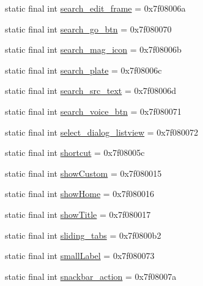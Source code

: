 \begin{CompactItemize}
\item 
static final int \hyperlink{classandroid_1_1support_1_1v7_1_1cardview_1_1_r_1_1id_cdcd1faf07234c23e78ff9e0a8ead7ea}{search\_\-edit\_\-frame} = 0x7f08006a
\item 
static final int \hyperlink{classandroid_1_1support_1_1v7_1_1cardview_1_1_r_1_1id_114052ec459693b90d0ca9a2bfab05f0}{search\_\-go\_\-btn} = 0x7f080070
\item 
static final int \hyperlink{classandroid_1_1support_1_1v7_1_1cardview_1_1_r_1_1id_bb635eb1793bd8857226cd3682f21097}{search\_\-mag\_\-icon} = 0x7f08006b
\item 
static final int \hyperlink{classandroid_1_1support_1_1v7_1_1cardview_1_1_r_1_1id_41dde8935259d539e700ab3c94dc6f18}{search\_\-plate} = 0x7f08006c
\item 
static final int \hyperlink{classandroid_1_1support_1_1v7_1_1cardview_1_1_r_1_1id_25f5f8d995e910219e56f1af14bb7fcc}{search\_\-src\_\-text} = 0x7f08006d
\item 
static final int \hyperlink{classandroid_1_1support_1_1v7_1_1cardview_1_1_r_1_1id_db4a6f09c72106ec13a043be6874d864}{search\_\-voice\_\-btn} = 0x7f080071
\item 
static final int \hyperlink{classandroid_1_1support_1_1v7_1_1cardview_1_1_r_1_1id_19743abf2b7df94024e501263d80fdb1}{select\_\-dialog\_\-listview} = 0x7f080072
\item 
static final int \hyperlink{classandroid_1_1support_1_1v7_1_1cardview_1_1_r_1_1id_5cbfc4569ee9d3ce65a70ed446fbc587}{shortcut} = 0x7f08005c
\item 
static final int \hyperlink{classandroid_1_1support_1_1v7_1_1cardview_1_1_r_1_1id_0d71db6707b7f320bab77c69785883e5}{showCustom} = 0x7f080015
\item 
static final int \hyperlink{classandroid_1_1support_1_1v7_1_1cardview_1_1_r_1_1id_dc2040fa82d2d468aaee09e4f908f1e7}{showHome} = 0x7f080016
\item 
static final int \hyperlink{classandroid_1_1support_1_1v7_1_1cardview_1_1_r_1_1id_bc88171058a1beee6f1ff9136ebfd096}{showTitle} = 0x7f080017
\item 
static final int \hyperlink{classandroid_1_1support_1_1v7_1_1cardview_1_1_r_1_1id_31d04f49b1ea188aa8d187deed9c6f5c}{sliding\_\-tabs} = 0x7f0800b2
\item 
static final int \hyperlink{classandroid_1_1support_1_1v7_1_1cardview_1_1_r_1_1id_4c06b328471f7b86a7e1d93283816cec}{smallLabel} = 0x7f080073
\item 
static final int \hyperlink{classandroid_1_1support_1_1v7_1_1cardview_1_1_r_1_1id_676e2f583f26ef4ad186045e28befc95}{snackbar\_\-action} = 0x7f08007a

\end{CompactItemize}
